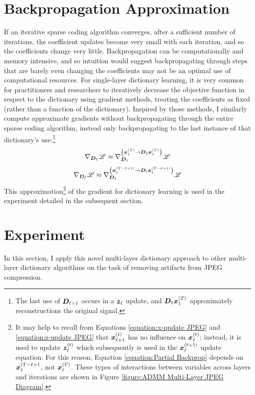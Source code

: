 \section{Backpropagation Approximation} \label{section:Partial Backprop}
If an iterative sparse coding algorithm converges, after a sufficient number of iterations, the coefficient updates become very small with each iteration, and so the coefficients change very little. Backpropagation can be computationally and memory intensive, and so intuition would suggest backpropagating through steps that are barely even changing the coefficients may not be an optimal use of computational resources. For single-layer dictionary learning, it is very common for practitioners and researchers to iteratively decrease the objective function in respect to the dictionary using gradient methods, treating the coefficients as fixed (rather than a function of the dictionary). Inspired by those methods, I similarly compute approximate gradients without backpropagating through the entire sparse coding algorithm, instead only backpropagating to the last instance of that dictionary's use:\footnote{The last use of $\bm{D}_{\ell + 1}$ occurs in a $\bm{z}_{\ell}$ update, and $\bm{D}_1\bm{x}_1^{(T)}$ approximately reconstructions the original signal.}
\begin{equation}
\nabla_{\bm{D}_1} \mathscr{L} \approx \nabla_{\bm{D}_1}^{\left(\bm{x}_1^{(T)} \rightarrow \bm{D}_1\bm{x}_1^{(T)}\right)} \mathscr{L}
\end{equation}
\begin{equation} \label{equation:Partial Backprop}
\nabla_{\bm{D}_{\ell}} \mathscr{L} \approx \nabla_{\bm{D}_{\ell}}^{\left(\bm{x}_{\ell}^{(T - \ell + 1)} \rightarrow \bm{D}_{\ell}\bm{x}_{\ell}^{(T - \ell + 1)}\right)} \mathscr{L}
\end{equation}
This approximation\footnote{It may help to recall from Equations \ref{equation:x-update JPEG} and \ref{equation:z-update JPEG} that $\bm{x}_{\ell + 1}^{(t)}$ has no influence on $\bm{x}_{\ell}^{(t)}$; instead, it is used to update $\bm{z}_{\ell}^{(t)}$ which subsequently is used in the $\bm{x}_{\ell}^{(t + 1)}$ update equation. For this reason, Equation \ref{equation:Partial Backprop} depends on $\bm{x}_{\ell}^{(T - \ell + 1}$, not $\bm{x}_{\ell}^{(T)}$. These types of interactions between variables across layers and iterations are shown in Figure \ref{figure:ADMM Multi-Layer JPEG Diagram}.} of the gradient for dictionary learning is used in the experiment detailed in the subsequent section.




\section{Experiment}
In this section, I apply this novel multi-layer dictionary approach to other multi-layer dictionary algorithms on the task of removing artifacts from JPEG compression.
